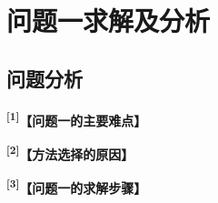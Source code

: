 \documentclass[UTF8,a4paper,12pt,fontset=fandol]{ctexart}
\newif\ifDraftAid
\newcommand{\ph}[1]{\textbf{\color{phg}【#1】}}
\newcommand{\detail}[1]{%
  \ifDraftAid\textnormal{\color{detailg}\small\,（参考写法：#1）}\fi}
\newcommand{\PHD}[2]{\ph{#1}\detail{#2}}
\newcommand{\SN}[1]{\textsuperscript{\color{noteg}\bfseries[#1]}}
\newcommand{\Note}[2]{\par\noindent\textbf{[#1]}\ #2}
\newcommand{\Annotated}[2]{%
\ifDraftAid
\noindent\begin{minipage}[t]{0.735\linewidth}\vspace{0pt}#1\end{minipage}\hfill
\begin{minipage}[t]{0.235\linewidth}\vspace{0pt}\footnotesize\color{noteg}\raggedright
\begin{tcolorbox}[colback=notebg,colframe=ruleg,boxrule=0.35pt,arc=1mm,left=1.2mm,right=1.2mm,top=1mm,bottom=1mm]
#2
\end{tcolorbox}\end{minipage}
\else
#1
\fi
}
\numberwithin{figure}{section}
\numberwithin{table}{section}
\begin{document}
\section{问题一求解及分析}
\subsection{问题分析}
\Annotated{
\SN{1}\PHD{问题一的主要难点}{在〔应用领域〕中，〔研究对象〕作为典型的〔高负载、高变化等特征〕对象，其〔关键环节〕一旦出现〔缺陷或异常〕，往往会产生〔周期性冲击、异常波动等〕现象。若不能及时识别，将直接威胁〔运行安全与系统可靠性〕。然而，现实场景下的〔数据〕受到〔载荷波动、环境变化、噪声干扰〕等多重因素影响，使得〔关键特征〕易被削弱甚至掩盖，从而增加了任务难度。传统依赖人工经验构造特征或单一处理手段的方法，在〔复杂多变场景〕中往往泛化不足，难以适应实际需求。}

\par\medskip
\SN{2}\PHD{方法选择的原因}{针对以上问题，本文在〔总体框架〕下，聚焦完成〔核心任务〕。考虑到原始样本存在数量稀缺和类别极度不平衡的问题，本文采用了〔窗口划分或重采样等策略〕，通过设计不同〔参数〕的窗口将〔连续数据〕划分为多个片段，一方面扩充了样本数量，另一方面平衡了不同类别的比例，为后续模型训练提供了充足且均衡的数据基础。}

\par\medskip
\SN{3}\PHD{问题一的求解步骤}{在特征提取方面，本文从〔角度A、角度B、角度C〕全面刻画〔研究对象特征〕，并采用〔相关性分析、主成分分析、重要性分析等〕多种方法对冗余或低相关特征进行筛选。经过多方法交叉验证后，本文最终确定了一组既具可解释性又能显著提升性能的有效特征，为后续〔任务〕奠定了坚实基础。整体思路流程如图〔编号〕所示。}
}{
\Note{1}{问题分析中尽量把“复杂”具体到噪声、非线性、分布差异等实际表现。}
\Note{2}{介绍所选方法前，可先说明普通处理方法在本题数据上的不足。}
\Note{3}{本问结束时说明最终得到哪些特征、指标或数据，方便与下一问衔接。}
}
\end{document}
